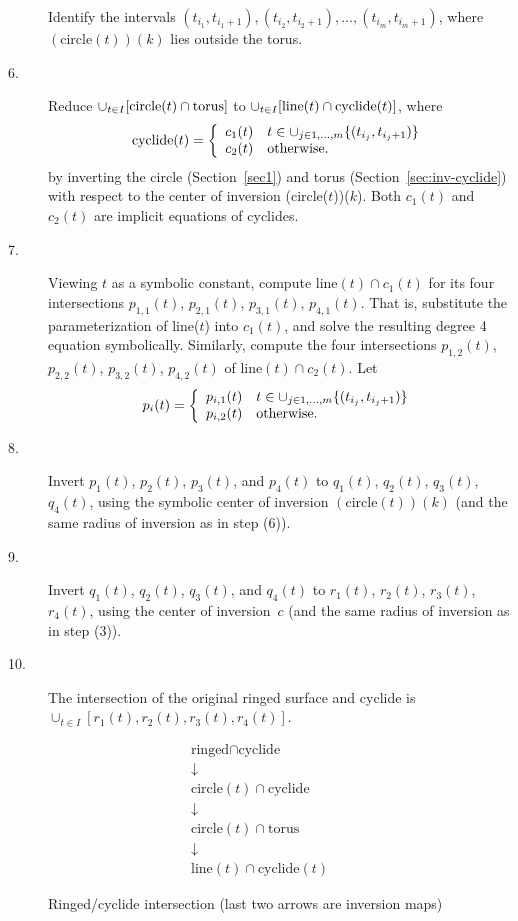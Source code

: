 \begin{description}
	Identify the intervals $(t_{i_1},t_{i_{1}+1}), (t_{i_2},t_{i_{2}+1}),
		\ldots, (t_{i_m},t_{i_{m}+1})$,
		where $(\mbox{circle}(t))(k)$ lies outside the torus.
\item[6.]
	Reduce $\cup_{t \in I}[{\rm circle}(t) \cap {\rm torus}]$
		to $\cup_{t \in I}[{\rm line}(t) \cap {\rm cyclide}(t)]$,
		where 
\[ 
	{\rm cyclide}(t) = \left\{ \begin{array}{ll}
		c_1(t) & t \in \cup_{j \in 1,\ldots,m}\{(t_{i_j},t_{i_{j}+1})\}
				\\
		c_2(t) & {\rm otherwise}.
	\end{array} \right.
\]
		by inverting the circle (Section~\ref{sec1}) and 
		torus (Section~\ref{sec:inv-cyclide}) with respect to the 
		center of inversion (circle($t$))($k$).
		Both $c_1(t)$ and $c_2(t)$ are implicit equations of cyclides.

\item[7.]
	Viewing $t$ as a symbolic constant,
		compute $\mbox{line}(t) \cap c_1(t)$
		for its four intersections $p_{1,1}(t)$, $p_{2,1}(t)$,
		$p_{3,1}(t)$, $p_{4,1}(t)$.
		That is, substitute the parameterization of line($t$) into
		$c_1(t)$, and solve the resulting degree 4 equation 
		symbolically.
		Similarly, compute the four intersections
		$p_{1,2}(t)$, $p_{2,2}(t)$, $p_{3,2}(t)$, $p_{4,2}(t)$
		of $\mbox{line}(t) \cap c_2(t)$.
		Let
\[ 
	p_i(t) = \left\{ \begin{array}{ll}
	p_{i,1}(t) & t \in \cup_{j \in 1,\dots,m}\{(t_{i_j},t_{i_{j}+1})\} 
				\\
		p_{i,2}(t) & {\rm otherwise}.
	\end{array} \right.
\]
\item[8.]
	Invert $p_1(t)$, $p_2(t)$, $p_3(t)$, and $p_4(t)$ to 
		$q_1(t)$, $q_2(t)$, $q_3(t)$, $q_4(t)$,
		using the symbolic center of inversion $(\mbox{circle}(t))(k)$
		(and the same radius of inversion as in step (6)).
\item[9.]
	Invert $q_1(t)$, $q_2(t)$, $q_3(t)$, and $q_4(t)$ to 
		$r_1(t)$, $r_2(t)$, $r_3(t)$, $r_4(t)$,
		using the center of \mbox{inversion $c$}
		(and the same radius of inversion as in step (3)).
\item[10.]
	The intersection of the original ringed surface and cyclide is
		$\cup_{t \in I} [r_1(t),r_2(t),r_3(t),r_4(t)]$.
\end{description}

\begin{figure}[h]
\[
\begin{array}{c}
\mbox{ringed} \cap \mbox{cyclide}  \\
\downarrow \\
\mbox{circle}(t) \cap \mbox{cyclide} \\
\downarrow \\
\mbox{circle}(t) \cap \mbox{torus} \\
\downarrow \\
\mbox{line}(t) \cap \mbox{cyclide}(t)
\end{array}
\]
\caption{Ringed/cyclide intersection (last two arrows are inversion maps)}
\label{fig:box}
\end{figure}


